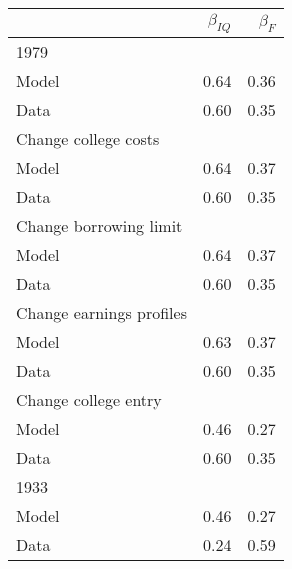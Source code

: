 \begin{tabular}{lrr}
\hline
  & $\beta_{IQ}$  & $\beta_{F}$  \\ 
\hline
1979 &   &   \\ 
Model & 0.64  & 0.36  \\ 
Data & 0.60  & 0.35  \\ 
Change college costs &   &   \\ 
Model & 0.64  & 0.37  \\ 
Data & 0.60  & 0.35  \\ 
Change borrowing limit &   &   \\ 
Model & 0.64  & 0.37  \\ 
Data & 0.60  & 0.35  \\ 
Change earnings profiles &   &   \\ 
Model & 0.63  & 0.37  \\ 
Data & 0.60  & 0.35  \\ 
Change college entry &   &   \\ 
Model & 0.46  & 0.27  \\ 
Data & 0.60  & 0.35  \\ 
1933 &   &   \\ 
Model & 0.46  & 0.27  \\ 
Data & 0.24  & 0.59  \\ 
\hline
\end{tabular}%
